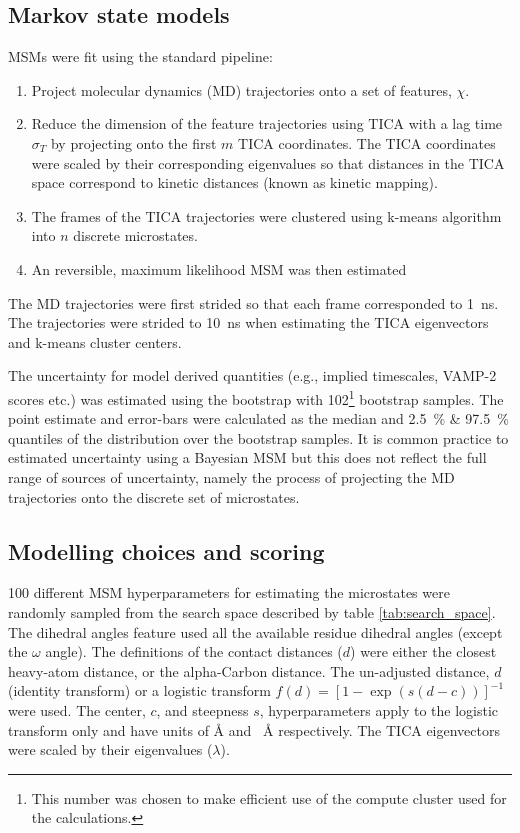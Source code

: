 \documentclass[journal=jacsat,manuscript=article]{achemso}
\begin{document}
\subsection{Markov state models}
MSMs were fit using the standard pipeline: 
\begin{enumerate}
    \item Project molecular dynamics (MD) trajectories onto a set of features, $\chi$. 
    \item Reduce the dimension of the feature trajectories using TICA with a lag time $\sigma_{T}$ by projecting onto the first $m$ TICA coordinates. The TICA coordinates were scaled by their corresponding eigenvalues so that distances in the TICA space correspond to kinetic distances (known as kinetic mapping).
    \item The frames of the TICA trajectories were clustered using k-means algorithm into $n$ discrete microstates. 
    \item An reversible, maximum likelihood MSM was then estimated  
\end{enumerate}
The MD trajectories were first strided so that each frame corresponded to \SI{1}{\nano\second}. The trajectories were strided to \SI{10}{\nano\second} when estimating the TICA eigenvectors and k-means cluster centers.

The uncertainty for model derived quantities (e.g., implied timescales, VAMP-2 scores etc.) was estimated using the bootstrap with \num{102}\footnote{This number was chosen to make efficient use of the compute cluster used for the calculations.} bootstrap samples. The point estimate and error-bars  were calculated as the median and  \SI{2.5}{\percent} \& \SI{97.5}{\percent} quantiles of the distribution over the bootstrap samples. It is common practice to estimated uncertainty using a Bayesian MSM but this does not reflect the full range of sources of uncertainty, namely the process of projecting the MD trajectories onto the discrete set of microstates. 


\subsection{Modelling choices and scoring}
\num{100} different MSM hyperparameters for estimating the microstates were randomly sampled from the search space described by table \ref{tab:search_space}. The dihedral angles feature used all the available residue dihedral angles (except the $\omega$ angle). The definitions of the contact distances ($d$) were either the closest heavy-atom distance, or the alpha-Carbon distance. The un-adjusted distance, $d$ (identity transform) or a  logistic transform $f(d) = [1-\exp{(s(d-c))}]^{-1}$ were used.  The center, $c$, and steepness $s$, hyperparameters apply to the logistic transform only and have units of \si{\angstrom} and \si{\per\angstrom} respectively. The TICA eigenvectors were scaled by their eigenvalues ($\lambda$).
\end{document}
